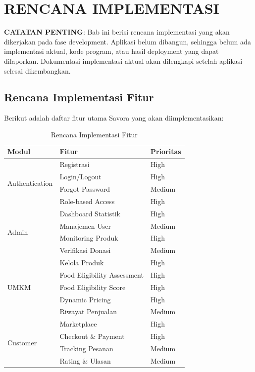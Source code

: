 \section{RENCANA IMPLEMENTASI}

\textbf{CATATAN PENTING}: Bab ini berisi rencana implementasi yang akan dikerjakan pada fase development. Aplikasi belum dibangun, sehingga belum ada implementasi aktual, kode program, atau hasil deployment yang dapat dilaporkan. Dokumentasi implementasi aktual akan dilengkapi setelah aplikasi selesai dikembangkan.

\subsection{Rencana Implementasi Fitur}

Berikut adalah daftar fitur utama Savora yang akan diimplementasikan:

\begin{table}[H]
\centering
\caption{Rencana Implementasi Fitur}
\label{tab:implementasi}
\small
\begin{tabularx}{\textwidth}{|l|X|X|}
\hline
\textbf{Modul} & \textbf{Fitur} & \textbf{Prioritas} \\
\hline
\multirow{4}{*}{Authentication} & Registrasi & High \\
\hline
& Login/Logout & High \\
\hline
& Forgot Password & Medium \\
\hline
& Role-based Access & High \\
\hline
\multirow{4}{*}{Admin} & Dashboard Statistik & High \\
\hline
& Manajemen User & Medium \\
\hline
& Monitoring Produk & High \\
\hline
& Verifikasi Donasi & Medium \\
\hline
\multirow{5}{*}{UMKM} & Kelola Produk & High \\
\hline
& Food Eligibility Assessment & High \\
\hline
& Food Eligibility Score & High \\
\hline
& Dynamic Pricing & High \\
\hline
& Riwayat Penjualan & Medium \\
\hline
\multirow{4}{*}{Customer} & Marketplace & High \\
\hline
& Checkout \& Payment & High \\
\hline
& Tracking Pesanan & Medium \\
\hline
& Rating \& Ulasan & Medium \\
\hline
\end{tabularx}
\end{table}

